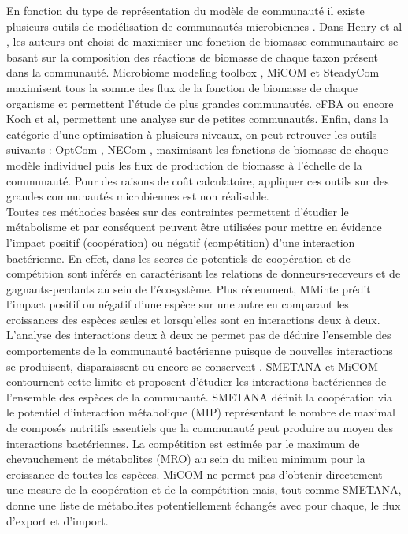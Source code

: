 \documentclass[../main.tex]{subfiles}
\begin{document}
En fonction du type de représentation du modèle de communauté il existe plusieurs outils de modélisation de communautés microbiennes \citep{Colarusso2021}. Dans Henry et al \citep{Henry2016}, les auteurs ont choisi de maximiser une fonction de biomasse communautaire se basant sur la composition des réactions de biomasse de chaque taxon présent dans la communauté. Microbiome modeling toolbox \citep{Baldini2019}, MiCOM \citep{diener2020} et SteadyCom \citep{Chan2017} maximisent tous la somme des flux de la fonction de biomasse de chaque organisme et permettent l'étude de plus grandes communautés.  cFBA \citep{Khandelwal2013} ou encore Koch et al, \citep{Koch2016} permettent une analyse sur de petites communautés. Enfin, dans la catégorie d'une optimisation à plusieurs niveaux, on peut retrouver les outils suivants : OptCom \citep{Zomorrodi2012}, NECom \citep{Cai2020}, maximisant les fonctions de biomasse de chaque modèle individuel puis les flux de production de biomasse à l'échelle de la communauté. Pour des raisons de coût calculatoire, appliquer ces outils sur des grandes communautés microbiennes est non réalisable. \\

Toutes ces méthodes basées sur des contraintes permettent d'étudier le métabolisme et par conséquent peuvent être utilisées pour mettre en évidence l'impact positif (coopération) ou négatif (compétition) d'une interaction bactérienne. En effet, dans \citep{Freilich2011} les scores de potentiels de coopération et de compétition sont inférés en caractérisant les relations de donneurs-receveurs et de gagnants-perdants au sein de l'écosystème. Plus récemment, MMinte \citep{Mendes-Soares2016} prédit l'impact positif ou négatif d'une espèce sur une autre en comparant les croissances des espèces seules et lorsqu'elles sont en interactions deux à deux. L'analyse des interactions deux à deux ne permet pas de déduire l'ensemble des comportements de la communauté bactérienne puisque de nouvelles interactions se produisent, disparaissent ou encore se conservent \citep{Morin2022}. SMETANA \citep{Zelezniak2015} et MiCOM \citep{diener2020} contournent cette limite et proposent d'étudier les interactions bactériennes de l'ensemble des espèces de la communauté.  SMETANA définit la coopération via le potentiel d'interaction métabolique (MIP) représentant le nombre de maximal de composés nutritifs essentiels que la communauté peut produire au moyen des interactions bactériennes. La compétition est  estimée par le maximum de chevauchement de métabolites (MRO) au sein du milieu minimum pour la croissance de toutes les espèces. MiCOM ne permet pas d'obtenir directement une mesure de la coopération et de la compétition mais, tout comme SMETANA, donne une liste de métabolites potentiellement échangés avec pour chaque, le flux d'export et d'import.\\
\end{document}

